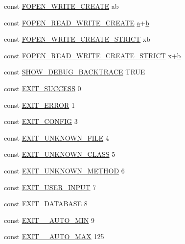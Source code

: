 \begin{DoxyCompactItemize}
\item 
const \hyperlink{constants_8php_a7c5689a170bbaab4dd9c6f3a76bd7a0d}{F\+O\+P\+E\+N\+\_\+\+W\+R\+I\+T\+E\+\_\+\+C\+R\+E\+A\+T\+E} \textquotesingle{}ab\textquotesingle{}
\item 
const \hyperlink{constants_8php_adcd04289bf4dc262b7652cb4c1eb08f7}{F\+O\+P\+E\+N\+\_\+\+R\+E\+A\+D\+\_\+\+W\+R\+I\+T\+E\+\_\+\+C\+R\+E\+A\+T\+E} \textquotesingle{}\hyperlink{assets_2js_2bootstrap_8min_8js_a1f5870dcf487187f13d5fd328ed9e6e7}{a}+\hyperlink{assets_2js_2bootstrap_8min_8js_a398bb8542498d1b14178b02b99df309b}{b}\textquotesingle{}
\item 
const \hyperlink{constants_8php_a02007ca17f39af174ac54d30f2ca7e82}{F\+O\+P\+E\+N\+\_\+\+W\+R\+I\+T\+E\+\_\+\+C\+R\+E\+A\+T\+E\+\_\+\+S\+T\+R\+I\+C\+T} \textquotesingle{}xb\textquotesingle{}
\item 
const \hyperlink{constants_8php_a2eeb98a015d74560e9b60ec60d7531d4}{F\+O\+P\+E\+N\+\_\+\+R\+E\+A\+D\+\_\+\+W\+R\+I\+T\+E\+\_\+\+C\+R\+E\+A\+T\+E\+\_\+\+S\+T\+R\+I\+C\+T} \textquotesingle{}x+\hyperlink{assets_2js_2bootstrap_8min_8js_a398bb8542498d1b14178b02b99df309b}{b}\textquotesingle{}
\item 
const \hyperlink{constants_8php_a7e2dd6fea73799257285946411aeb5ce}{S\+H\+O\+W\+\_\+\+D\+E\+B\+U\+G\+\_\+\+B\+A\+C\+K\+T\+R\+A\+C\+E} T\+R\+U\+E
\item 
const \hyperlink{constants_8php_a44a73f871298e7befa219da1d96c4bf8}{E\+X\+I\+T\+\_\+\+S\+U\+C\+C\+E\+S\+S} 0
\item 
const \hyperlink{constants_8php_a0072a08da382eee32afd352989a3cfc2}{E\+X\+I\+T\+\_\+\+E\+R\+R\+O\+R} 1
\item 
const \hyperlink{constants_8php_a0c5a2fe588c43f68077982ecc971381e}{E\+X\+I\+T\+\_\+\+C\+O\+N\+F\+I\+G} 3
\item 
const \hyperlink{constants_8php_a9d94a7e06ea3247295ecf2f17f077b77}{E\+X\+I\+T\+\_\+\+U\+N\+K\+N\+O\+W\+N\+\_\+\+F\+I\+L\+E} 4
\item 
const \hyperlink{constants_8php_a7b2af799ecefe2b0471c319bafc26850}{E\+X\+I\+T\+\_\+\+U\+N\+K\+N\+O\+W\+N\+\_\+\+C\+L\+A\+S\+S} 5
\item 
const \hyperlink{constants_8php_aeb461d43337d49e2ba92c555caa8597c}{E\+X\+I\+T\+\_\+\+U\+N\+K\+N\+O\+W\+N\+\_\+\+M\+E\+T\+H\+O\+D} 6
\item 
const \hyperlink{constants_8php_af3a83fa2732cd58b95a81a858b18e4ab}{E\+X\+I\+T\+\_\+\+U\+S\+E\+R\+\_\+\+I\+N\+P\+U\+T} 7
\item 
const \hyperlink{constants_8php_a64406bc73261c35be6e74855a149ad68}{E\+X\+I\+T\+\_\+\+D\+A\+T\+A\+B\+A\+S\+E} 8
\item 
const \hyperlink{constants_8php_adfa393658ac3789382a67aae1519af8f}{E\+X\+I\+T\+\_\+\+\_\+\+A\+U\+T\+O\+\_\+\+M\+I\+N} 9
\item 
const \hyperlink{constants_8php_ac8895d88dadde460367dbf922ddfc194}{E\+X\+I\+T\+\_\+\+\_\+\+A\+U\+T\+O\+\_\+\+M\+A\+X} 125
\end{DoxyCompactItemize}


